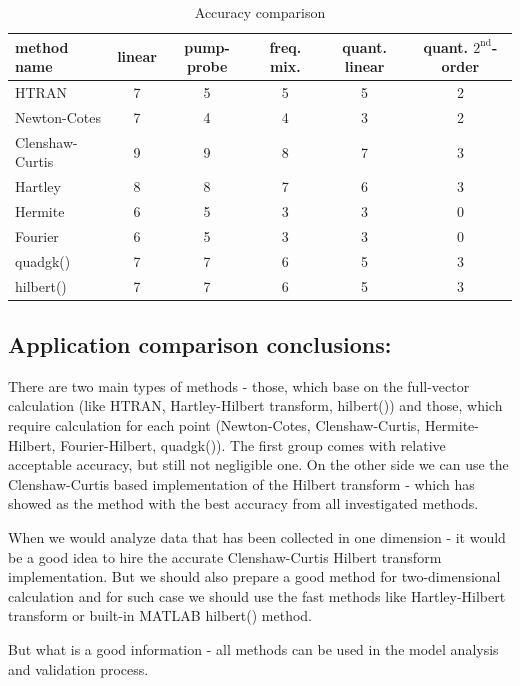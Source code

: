 \documentclass[12pt,twoside,a4paper]{article}
\numberwithin{equation}{subsection}
\numberwithin{figure}{subsection}
\begin{document}
\begin{table}
  \caption{Accuracy comparison} \label{gencom_accuracy} 
  \begin{tabular}{l | c | c | c | c | c}
    method name  &  linear  &  pump-probe  &  freq. mix.  &  quant. linear  &  quant. $2^{\text{nd}}$-order \\
    \hline
    HTRAN            &  7  &  5  &  5  &  5  &  2  \\
    Newton-Cotes     &  7  &  4  &  4  &  3  &  2  \\
    Clenshaw-Curtis  &  9  &  9  &  8  &  7  &  3  \\
    Hartley          &  8  &  8  &  7  &  6  &  3  \\
    Hermite          &  6  &  5  &  3  &  3  &  0  \\
    Fourier          &  6  &  5  &  3  &  3  &  0  \\
    quadgk()         &  7  &  7  &  6  &  5  &  3  \\
    hilbert()        &  7  &  7  &  6  &  5  &  3  \\
    \hline
  \end{tabular}
\end{table}


\subsection{Application comparison conclusions:} \label{chap:gencom_application}


There are two main types of methods - those, which base on the full-vector calculation (like HTRAN, Hartley-Hilbert transform, hilbert()) and those, which require calculation for each point (Newton-Cotes, Clenshaw-Curtis, Hermite-Hilbert, Fourier-Hilbert, quadgk()). The first group comes with relative acceptable accuracy, but still not negligible one. On the other side we can use the Clenshaw-Curtis based implementation of the Hilbert transform - which has showed as the method with the best accuracy from all investigated methods.

When we would analyze data that has been collected in one dimension - it would be a good idea to hire the accurate Clenshaw-Curtis Hilbert transform implementation. But we should also prepare a good method for two-dimensional calculation and for such case we should use the fast methods like Hartley-Hilbert transform or built-in MATLAB \textregistered hilbert() method.

But what is a good information - all methods can be used in the model analysis and validation process.
\end{document}
